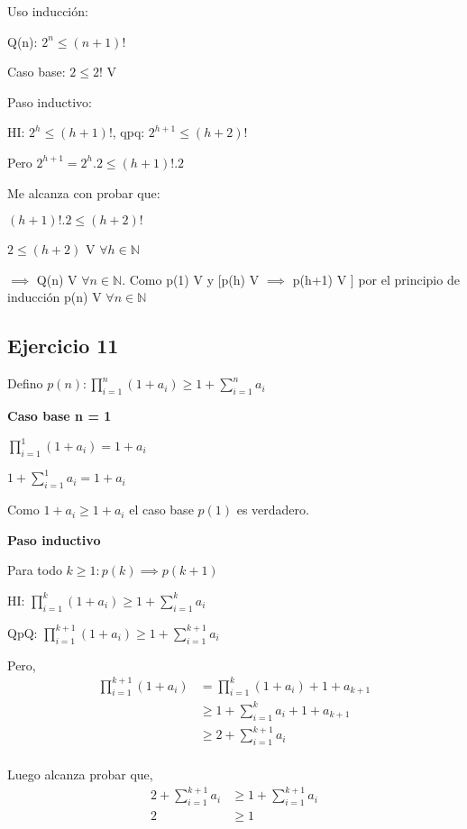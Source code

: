 Uso inducción:

Q(n): $2^n \leqslant (n+1)!$

Caso base: $2 \leqslant 2!$ V

Paso inductivo: 

HI: $2^h \leqslant (h+1)!$, qpq: $2^{h+1} \leqslant (h+2)!$

Pero $2^{h+1}=2^h.2 \leqslant (h+1)!.2$

Me alcanza con probar que: 

$(h+1)!.2 \leqslant (h+2)!$

$2 \leqslant (h+2)$ V $\forall h \in \mathbb{N}$

$\implies$ Q(n) V $\forall n \in \mathbb{N}.$ Como p(1) V y [p(h) V $\implies$ p(h+1) V ] por el principio de inducción p(n) V $\forall n \in \mathbb N$

\subsection{Ejercicio 11}

Defino $ p(n): \prod_{i=1}^{n}(1+a_i)\geq 1+\sum_{i=1}^{n}a_i $

\textbf{Caso base n = 1}

$ \prod_{i=1}^{1}(1+a_i) = 1 + a_i $

$ 1+\sum_{i=1}^{1}a_i = 1+a_i $

Como $ 1 + a_i \geq 1 + a_i $ el caso base $p(1)$ es verdadero.

\textbf{Paso inductivo}

Para todo $k \geq 1: p(k) \implies p(k+1)$

HI: $\prod_{i=1}^{k}(1+a_i) \geq 1+\sum_{i=1}^{k}a_i$

QpQ: $ \prod_{i=1}^{k+1}(1+a_i) \geq 1+\sum_{i=1}^{k+1}a_i$

Pero,
\begin{align*}
    \prod_{i=1}^{k+1}(1+a_i) &= \prod_{i=1}^{k}(1+a_i) + 1+a_{k+1} \\
    &\geq 1+\sum_{i=1}^{k}a_i + 1+a_{k+1} \\
    &\geq 2+\sum_{i=1}^{k+1}a_i \\
\end{align*}

Luego alcanza probar que,
\begin{align*}
    2+\sum_{i=1}^{k+1}a_i &\geq 1+\sum_{i=1}^{k+1}a_i \\
    2 &\geq 1 \\
\end{align*}

